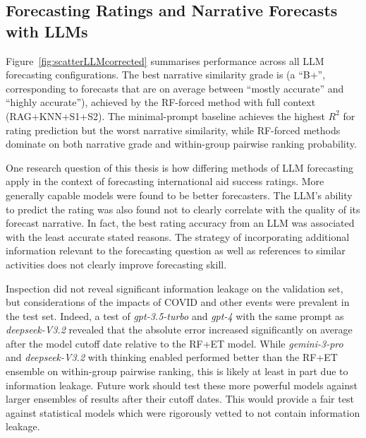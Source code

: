\subsection{Forecasting Ratings and Narrative Forecasts with LLMs} \label{sec:llm_results}

Figure~\ref{fig:scatterLLMcorrected} summarises performance across all LLM forecasting configurations. The best narrative similarity grade is \BestNarrativeGrade{} (a ``B+'', corresponding to forecasts that are on average between ``mostly accurate'' and ``highly accurate''), achieved by the RF-forced method with full context (RAG+KNN+S1+S2). The minimal-prompt baseline achieves the highest $R^2$ for rating prediction but the worst narrative similarity, while RF-forced methods dominate on both narrative grade and within-group pairwise ranking probability. 

One research question of this thesis is how differing methods of LLM forecasting apply in the context of forecasting international aid success ratings. More generally capable models were found to be better forecasters. The LLM's ability to predict the rating was also found not to clearly correlate with the quality of its forecast narrative. In fact, the best rating accuracy from an LLM was associated with the least accurate stated reasons. The strategy of incorporating additional information relevant to the forecasting question as well as references to similar activities does not clearly improve forecasting skill.

Inspection did not reveal significant information leakage on the validation set, but considerations of the impacts of COVID and other events were prevalent in the test set. Indeed, a test of \emph{gpt-3.5-turbo} and \emph{gpt-4} with the same prompt as \emph{deepseek-V3.2} revealed that the absolute error increased significantly on average after the model cutoff date relative to the RF+ET model. While \emph{gemini-3-pro} and \emph{deepseek-V3.2} with thinking enabled performed better than the RF+ET ensemble on within-group pairwise ranking, this is likely at least in part due to information leakage. Future work should test these more powerful models against larger ensembles of results after their cutoff dates. This would provide a fair test against statistical models which were rigorously vetted to not contain information leakage.


